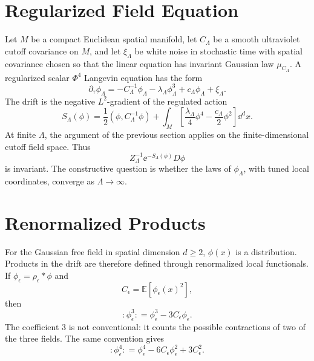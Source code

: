 \section{Regularized Field Equation}

Let \(M\) be a compact Euclidean spatial manifold, let \(C_\Lambda\) be a
smooth ultraviolet cutoff covariance on \(M\), and let \(\xi_\Lambda\) be
white noise in stochastic time with spatial covariance chosen so that the
linear equation has invariant Gaussian law \(\mu_{C_\Lambda}\).  A
regularized scalar \(\Phi^4\) Langevin equation has the form
\begin{equation}
  \partial_\tau\phi_\Lambda
  =
  -C_\Lambda^{-1}\phi_\Lambda
  -\lambda_\Lambda\phi_\Lambda^3
  +c_\Lambda\phi_\Lambda
  +\xi_\Lambda .
  \label{eq:regularized-spde-gradient-flow}
\end{equation}
The drift is the negative \(L^2\)-gradient of the regulated action
\begin{equation}
  S_\Lambda(\phi)
  =
  \frac12(\phi,C_\Lambda^{-1}\phi)
  +
  \int_M
  \left[
    \frac{\lambda_\Lambda}{4}\phi^4
    -\frac{c_\Lambda}{2}\phi^2
  \right]\dd^dx .
  \label{eq:regularized-spde-action}
\end{equation}
At finite \(\Lambda\), the argument of the previous section applies on the
finite-dimensional cutoff field space.  Thus
\[
  Z_\Lambda^{-1}\ee^{-S_\Lambda(\phi)}D\phi
\]
is invariant.  The constructive question is whether the laws of
\(\phi_\Lambda\), with tuned local coordinates, converge as
\(\Lambda\to\infty\).

\section{Renormalized Products}

For the Gaussian free field in spatial dimension \(d\geq2\), \(\phi(x)\) is
a distribution.  Products in the drift are therefore defined through
renormalized local functionals.  If
\(\phi_\epsilon=\rho_\epsilon\ast\phi\) and
\[
  C_\epsilon=\mathbb E[\phi_\epsilon(x)^2],
\]
then
\begin{equation}
  :\!\phi_\epsilon^3\!:
  =
  \phi_\epsilon^3-3C_\epsilon\phi_\epsilon .
  \label{eq:spde-cubic-wick-product}
\end{equation}
The coefficient \(3\) is not conventional: it counts the possible
contractions of two of the three fields.  The same convention gives
\[
  :\!\phi_\epsilon^4\!:
  =
  \phi_\epsilon^4-6C_\epsilon\phi_\epsilon^2+3C_\epsilon^2 .
\]

